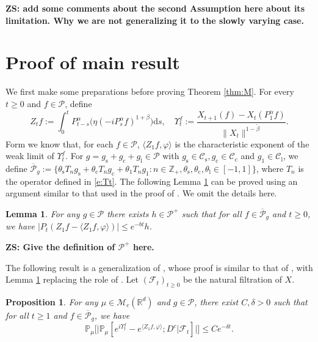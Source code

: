 \documentclass[12pt,a4paper]{amsart}
\theoremstyle{plain}
\newtheorem{lem}[thm]{Lemma}
\newtheorem{prop}[thm]{Proposition}
\theoremstyle{definition}
\numberwithin{equation}{section}
\begin{document}
{\bf ZS: add some comments about the second Assumption here about its limitation. Why we are not generalizing it to the slowly varying case.}

\section{Proof of main result}
\label{proofs of main results}
	We first make some preparations before proving Theorem \ref{thm:M}.
	For every $t\geq 0$ and $f\in \mathcal P$, define
\[
  	Z_t f
  	:= \int_0^t P^\alpha_{t-s}\big( \eta (-i P^\alpha_sf)^{1+\beta}\big)\mathrm ds,
  	\quad \Upsilon^f_t
   	:= \frac{X_{t+1} (f) - X_t(P_1^\alpha f)}{\| X_t\|^{1-\tilde \beta}}.
\]
	Form \cite[Theorem 3.4]{RenSongSunZhao2019Stable} we know that, for each $f\in \mathcal P$, $\langle Z_1f,\varphi\rangle$ is the characteristic exponent of 
the weak limit of $\Upsilon^f_t$.
	For $g = g_\mathrm s + g_\mathrm c + g_\mathrm l\in \mathcal P$ with $g_\mathrm s \in \mathcal C_\mathrm s, g_\mathrm c \in \mathcal C_\mathrm c$ and $g_\mathrm 1 \in \mathcal C_\mathrm l$, we define $\overline {\mathcal P}_g:= \{\theta_\mathrm s T_n g_\mathrm s +  \theta_\mathrm c T_n g_\mathrm c + \theta_\mathrm 1 T_n g_\mathrm 1: n \in \mathbb Z_+, \theta_\mathrm s, \theta_\mathrm c, \theta_\mathrm l \in [-1,1]\}$, where $T_n$ is the operator defined in \eqref{e:Tt}.
	The following Lemma \ref{lem:P:R} can be proved using 
an argument similar to that used in the proof of 
	\cite[Lemma 2.9]{RenSongSunZhao2019Stable}. We omit the details here.
\begin{lem}
\label{lem:P:R}
	For any $g\in \mathcal P$ there exists $h \in \mathcal P^+$ such that for all $ f \in \overline {\mathcal P}_g$ and $t\geq 0$, we have $ | P_t (Z_1 f - \langle Z_1 f, \varphi \rangle )| \leq e^{-bt} h$.
\end{lem}

{\bf ZS: Give the definition of $\mathcal P^+$ here.}

	The following result is a generalization of \cite[Proposition 3.5]{RenSongSunZhao2019Stable}, whose proof is similar to that of \cite[Proposition 3.5]{RenSongSunZhao2019Stable},
with Lemma \ref{lem:P:R} replacing the role of \cite[Lemma 2.9]{RenSongSunZhao2019Stable}.
	Let $(\mathscr F_t)_{t\geq 0}$ be the natural filtration of $X$.
	\begin{prop}
\label{thm:Key}
	For any $\mu \in \mathcal M_c(\mathbb R^d)$  and $g \in \mathcal P$, there exist $C,\delta>0$ such that for all $t\geq 1$ and $f \in \overline{\mathcal P}_g$, we have
\[
	\mathbb P_\mu
	\Big[ \big|\mathbb P_\mu [e^{i\Upsilon^f_t} - e^{\langle Z_1f, \varphi\rangle}; D^c | \mathscr F_t ]  \big|\Big]
	\leq C e^{- \delta t}.
\]
\end{prop}
\end{document}
